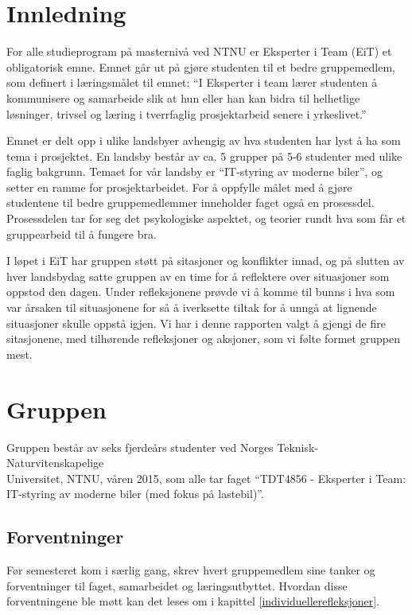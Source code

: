 \chapter{Innledning}

For alle studieprogram på masternivå ved NTNU er Eksperter i Team (EiT) et obligatorisk emne. Emnet går ut på gjøre 
studenten til et bedre gruppemedlem, som definert i læringsmålet til emnet: ``I Eksperter i team lærer studenten å 
kommunisere og samarbeide slik at hun eller han kan
bidra til helhetlige løsninger, trivsel og læring i tverrfaglig prosjektarbeid senere i yrkeslivet.'' \cite{laeringsmaal}

Emnet er delt opp i ulike landsbyer avhengig av hva studenten har lyst å ha som tema i prosjektet. En landsby består 
av ca. 5 grupper på 5-6 studenter med ulike faglig bakgrunn. Temaet for vår landsby er ``IT-styring av moderne 
biler'', og setter en ramme for prosjektarbeidet. \cite{tdt4856} For å oppfylle målet med å gjøre studentene til bedre gruppemedlemmer 
inneholder faget også en prosessdel. Prosessdelen tar for seg det psykologiske aspektet, og teorier rundt hva som får 
et gruppearbeid til å fungere bra.

I løpet i EiT har gruppen støtt på sitasjoner og konflikter innad, og på slutten av 
hver landsbydag satte gruppen av en time for å reflektere over situasjoner som oppstod den dagen. Under refleksjonene 
prøvde vi å komme til bunns i hva som var årsaken til situasjonene for så å iverksette tiltak for å unngå 
at lignende situasjoner skulle oppstå igjen. Vi har i denne rapporten valgt å gjengi de fire sitasjonene, med tilhørende 
refleksjoner og aksjoner, som vi følte formet gruppen mest.

\chapter{Gruppen} 
Gruppen består av seks fjerdeårs studenter ved Norges Teknisk-
Naturvitenskapelige\\Universitet, NTNU, våren 2015, som alle tar faget ``TDT4856 
- Eksperter i Team: IT-styring av moderne biler (med fokus på lastebil)''.	 

\section{Forventninger}
Før semesteret kom i særlig gang, skrev hvert gruppemedlem sine tanker og 
forventninger til faget, samarbeidet og læringsutbyttet. Hvordan disse
forventningene ble møtt kan det leses om i kapittel \ref{individuellerefleksjoner}.

